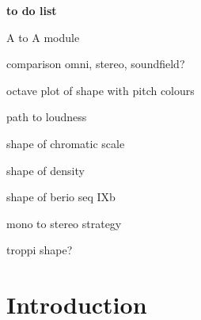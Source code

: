 \documentclass{article}
\title{\papertitle}
\begin{document}
%

\textbf{to do list}

\begin{compactitem}
	\item A to A module
	\item comparison omni, stereo, soundfield?
	\item octave plot of shape with pitch colours
	\item path to loudness
	\item shape of chromatic scale
	\item shape of density
	\item shape of berio seq IXb
	\item mono to stereo strategy
	\item troppi shape?
\end{compactitem}
\clearpage
%
\capstartfalse
\maketitle
\capstarttrue


\begin{abstract}

Place your abstract at the top left column on the first page.
Please write about 150--200 words that specifically highlight the purpose of your work,
its context, and provide a brief synopsis of your results.
Avoid equations in this part. \\
Non mettere referenze in questa parte.

\end{abstract}


\section{Introduction}
\label{sec:intro}
\end{document}
